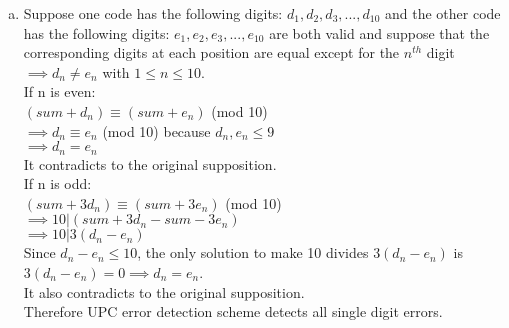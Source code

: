 \begin{enumerate}[(a)]
\item
Suppose one code has the following digits: $d_1,d_2,d_3,...,d_{10}$ and the other code has the following digits: $e_1,e_2,e_3,...,e_{10}$ are both valid and suppose that the corresponding digits at each position are equal except for the $n^{th}$ digit $\implies d_n \neq e_n$ with $1 \le n \le 10$.\\
If n is even:\\
$(sum + d_n) \equiv (sum + e_n)$ (mod 10)\\
$\implies d_n \equiv e_n$ (mod 10) because $d_n, e_n \le 9$\\
$\implies d_n = e_n$\\
It contradicts to the original supposition.\\
If n is odd:\\
$(sum+3d_n) \equiv (sum+3e_n)$ (mod 10)\\
$\implies 10|(sum+3d_n-sum-3e_n)$\\
$\implies 10|3(d_n-e_n)$\\
Since $d_n-e_n \le 10$, the only solution to make 10 divides $3(d_n-e_n)$ is $3(d_n-e_n)=0 \implies d_n=e_n$.\\
It also contradicts to the original supposition.\\
Therefore UPC error detection scheme detects all single digit errors.
\end{enumerate}

